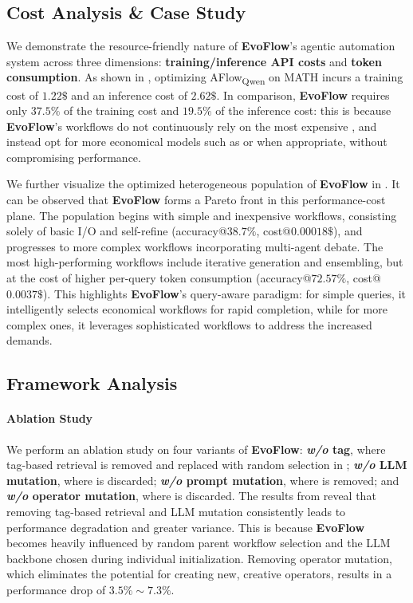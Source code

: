 \documentclass{article}
\theoremstyle{plain}
\theoremstyle{definition}
\theoremstyle{remark}
\newcommand{\ourmethod}{{\fontfamily{lmtt}\selectfont \textbf{EvoFlow}}\xspace}
\newcommand{\llmname}[1]{{\fontfamily{pcr}\selectfont {#1}}\xspace}
\begin{document}
\vspace{-0.8em}
\subsection{Cost Analysis \& Case Study}
\vspace{-0.5em}
We demonstrate the resource-friendly nature of \ourmethod's agentic automation system across three dimensions: \textbf{training/inference API costs} and \textbf{token consumption}. As shown in , optimizing AFlow\textsubscript{Qwen} on MATH incurs a training cost of $1.22\$$ and an inference cost of $2.62\$$. In comparison, \ourmethod requires only $37.5\%$ of the training cost and $19.5\%$ of the inference cost: this is because \ourmethod’s workflows do not continuously rely on the most expensive \llmname{qwen-2.5-72b}, and instead opt for more economical models such as \llmname{llama-3.1} or \llmname{herme-3-70b} when appropriate, without compromising performance. 

We further visualize the optimized heterogeneous population of \ourmethod in . It can be observed that \ourmethod forms a Pareto front in this performance-cost plane. The population begins with simple and inexpensive workflows, consisting solely of basic I/O and self-refine (accuracy@$38.7\%$, cost@$0.00018\$$), and progresses to more complex workflows incorporating multi-agent debate. The most high-performing workflows include iterative generation and ensembling, but at the cost of higher per-query token consumption (accuracy@$72.57\%$, cost@$0.0037\$$). This highlights \ourmethod's query-aware paradigm: for simple queries, it intelligently selects economical workflows for rapid completion, while for more complex ones, it leverages sophisticated workflows to address the increased demands.

\vspace{-0.4em}
\subsection{Framework Analysis}
\vspace{-0.4em}
\paragraph{Ablation Study}  We perform an ablation study on four variants of \ourmethod: \textbf{\textit{w/o} tag}, where tag-based retrieval is removed and replaced with random selection in ; \textbf{\textit{w/o} LLM mutation}, where  is discarded; \textbf{\textit{w/o} prompt mutation}, where  is removed; and \textbf{\textit{w/o} operator mutation}, where  is discarded. The results from  reveal that removing tag-based retrieval and LLM mutation consistently leads to performance degradation and greater variance. This is because \ourmethod becomes heavily influenced by random parent workflow selection and the LLM backbone chosen during individual initialization. Removing operator mutation, which eliminates the potential for creating new, creative operators, results in a performance drop of $3.5\%\sim7.3\%$.
\end{document}

